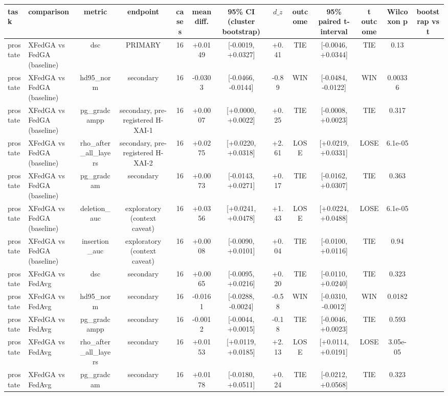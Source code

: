 \begin{tabular}{llccccccccccc}
\hline
task & comparison & metric & endpoint & cases & mean diff. & 95\% CI (cluster bootstrap) & $d\_z$ & outcome & 95\% paired t-interval & t outcome & Wilcoxon p & bootstrap vs t \\
\hline
prostate & XFedGA vs FedGA (baseline) & dsc & PRIMARY & 16 & +0.0149 & [-0.0019, +0.0327] & +0.41 & TIE & [-0.0046, +0.0344] & TIE & 0.13 &  \\
prostate & XFedGA vs FedGA (baseline) & hd95\_norm & secondary & 16 & -0.0303 & [-0.0466, -0.0144] & -0.89 & WIN & [-0.0484, -0.0122] & WIN & 0.00336 &  \\
prostate & XFedGA vs FedGA (baseline) & pg\_gradcampp & secondary, pre-registered H-XAI-1 & 16 & +0.0007 & [+0.0000, +0.0022] & +0.25 & TIE & [-0.0008, +0.0023] & TIE & 0.317 &  \\
prostate & XFedGA vs FedGA (baseline) & rho\_after\_all\_layers & secondary, pre-registered H-XAI-2 & 16 & +0.0275 & [+0.0220, +0.0318] & +2.61 & LOSE & [+0.0219, +0.0331] & LOSE & 6.1e-05 &  \\
prostate & XFedGA vs FedGA (baseline) & pg\_gradcam & secondary & 16 & +0.0073 & [-0.0143, +0.0271] & +0.17 & TIE & [-0.0162, +0.0307] & TIE & 0.363 &  \\
prostate & XFedGA vs FedGA (baseline) & deletion\_auc & exploratory (context caveat) & 16 & +0.0356 & [+0.0241, +0.0478] & +1.43 & LOSE & [+0.0224, +0.0488] & LOSE & 6.1e-05 &  \\
prostate & XFedGA vs FedGA (baseline) & insertion\_auc & exploratory (context caveat) & 16 & +0.0008 & [-0.0090, +0.0101] & +0.04 & TIE & [-0.0100, +0.0116] & TIE & 0.94 &  \\
prostate & XFedGA vs FedAvg & dsc & secondary & 16 & +0.0065 & [-0.0095, +0.0216] & +0.20 & TIE & [-0.0110, +0.0240] & TIE & 0.323 &  \\
prostate & XFedGA vs FedAvg & hd95\_norm & secondary & 16 & -0.0161 & [-0.0288, -0.0024] & -0.58 & WIN & [-0.0310, -0.0012] & WIN & 0.0182 &  \\
prostate & XFedGA vs FedAvg & pg\_gradcampp & secondary & 16 & -0.0012 & [-0.0044, +0.0015] & -0.18 & TIE & [-0.0046, +0.0023] & TIE & 0.593 &  \\
prostate & XFedGA vs FedAvg & rho\_after\_all\_layers & secondary & 16 & +0.0153 & [+0.0119, +0.0185] & +2.13 & LOSE & [+0.0114, +0.0191] & LOSE & 3.05e-05 &  \\
prostate & XFedGA vs FedAvg & pg\_gradcam & secondary & 16 & +0.0178 & [-0.0180, +0.0511] & +0.24 & TIE & [-0.0212, +0.0568] & TIE & 0.323 &  \\

\end{tabular}
